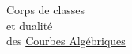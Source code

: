 \begin{flushright}
Corps de classes\\
et dualité\\
des \uline{Courbes Algébriques}
\end{flushright}

